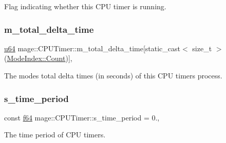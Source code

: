Flag indicating whether this C\+PU timer is running. \hypertarget{classmage_1_1_c_p_u_timer_ac2287cfab6d9fc6db131c6ea7c84b389}{}\label{classmage_1_1_c_p_u_timer_ac2287cfab6d9fc6db131c6ea7c84b389} 
\subsubsection{\texorpdfstring{m\+\_\+total\+\_\+delta\+\_\+time}{m\_total\_delta\_time}}
{\footnotesize\ttfamily \hyperlink{namespacemage_aee97da48a07394dd617c9deb60ed2064}{u64} mage\+::\+C\+P\+U\+Timer\+::m\+\_\+total\+\_\+delta\+\_\+time\mbox{[}static\+\_\+cast$<$ size\+\_\+t $>$(\hyperlink{classmage_1_1_c_p_u_timer_a98d59db3c396b14269c937e016c7625eae93f994f01c537c4e2f7d8528c3eb5e9}{Mode\+Index\+::\+Count})\mbox{]}\hspace{0.3cm}{\ttfamily [mutable]}, {\ttfamily [private]}}

The modes\textquotesingle{} total delta times (in seconds) of this C\+PU timer\textquotesingle{}s process. \hypertarget{classmage_1_1_c_p_u_timer_a23fe9f25f7d24c47a9a5db827ec56ba6}{}\label{classmage_1_1_c_p_u_timer_a23fe9f25f7d24c47a9a5db827ec56ba6} 
\subsubsection{\texorpdfstring{s\+\_\+time\+\_\+period}{s\_time\_period}}
{\footnotesize\ttfamily const \hyperlink{namespacemage_ab935747c6941320bd6214b5a5f265b09}{f64} mage\+::\+C\+P\+U\+Timer\+::s\+\_\+time\+\_\+period = 0.\hspace{0.3cm}{\ttfamily [static]}, {\ttfamily [private]}}

The time period of C\+PU timers. 